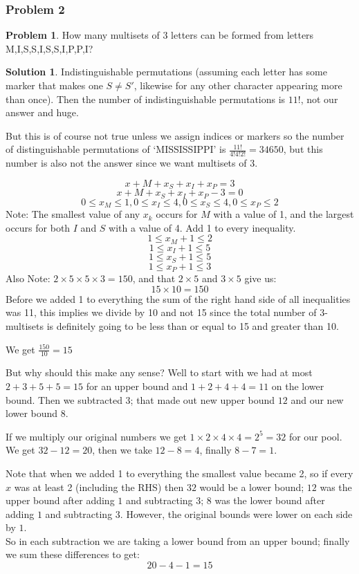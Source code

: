 \documentclass[10pt,a4paper,titlepage,twoside,draft]{article}
\theoremstyle{plain}
\theoremstyle{definition}
\newtheorem*{prob}{Problem}
\newtheorem*{sol}{Solution}
\theoremstyle{remark}
\begin{document}
\subsubsection{Problem 2}

\begin{prob}
How many multisets of 3 letters can be formed from letters M,I,S,S,I,S,S,I,P,P,I?
\end{prob}

\medskip

\begin{sol}
Indistinguishable permutations (assuming each letter has some marker that makes one $S \neq S' $, likewise for any other character appearing more than once). 
Then the number of indistinguishable permutations is $11!$, not our answer and huge.

\smallskip

But this is of course not true unless we assign indices or markers so the number of distinguishable permutations of `MISSISSIPPI' is $\frac{11!}{4!4!2!} = 34650$, but this number is also not the answer since we want multisets of 3. 

\smallskip

\[ x+{M} + x_{S} + x_{I} + x_{P} = 3 \]
\[ x+{M} + x_{S} + x_{I} + x_{P} - 3 = 0 \]
\[ 0 \leq x_{M} \leq 1, 0 \leq x_{I} \leq 4, 0 \leq x_{S} \leq 4, 0 \leq x_{P} \leq 2 \]
Note: The smallest value of any $x_{k}$ occurs for $M$ with a value of 1, and the largest occurs for both $I$ and $S$ with a value of 4. Add 1 to every inequality.
\[ 1 \leq x_{M}+1 \leq 2 \]
\[ 1 \leq x_{I} +1 \leq 5 \]
\[ 1 \leq x_{S} +1 \leq 5 \]
\[ 1 \leq x_{P} +1 \leq 3 \]
Also Note: $2 \times 5 \times 5 \times 3 = 150$, and that $2 \times 5$ and $3 \times 5$ give us: 
\[ 15 \times 10 =150 \] 
Before we added 1 to everything the sum of the right hand side of all inequalities was 11, this implies we divide by 10 and not 15 since the total number of 3-multisets is definitely going to be less than or equal to 15 and greater than 10. 

We get $ \frac{150}{10} = 15$ 

But why should this make any sense? Well to start with we had at most $2 +3 + 5 +5 = 15$ for an upper bound and $1+2+4+4=11$ on the lower bound. Then we subtracted $3$; that made out new upper bound $12$ and our new lower bound $8$.

If we multiply our original numbers we get $1 \times 2 \times 4 \times 4 = 2^{5} =32$ for our pool. 
We get $32-12 = 20$, then we take $12 -8 = 4$, finally $8 - 7 =1$.

Note that when we added 1 to everything the smallest value became 2, so if every $x$ was at least 2 (including the RHS) then $32$ would be a lower bound; $12$ was the upper bound after adding $1$ and subtracting $3$; $8$ was the lower bound after adding $1$ and subtracting $3$.
However, the original bounds were lower on each side by $1$. \\
So in each subtraction we are taking a lower bound from an upper bound; finally we sum these differences to get: 
\[ 20 - 4 - 1 = 15 \] 
\end{sol}
\end{document}
